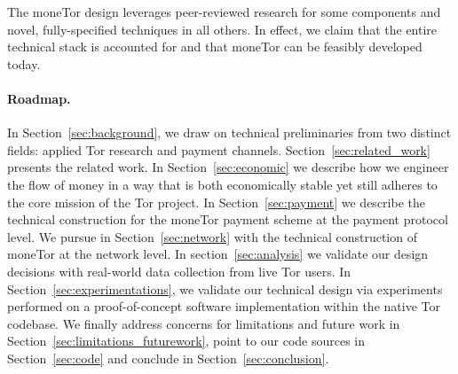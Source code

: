 The moneTor design leverages peer-reviewed research for some components and
novel, fully-specified techniques in all others. In effect, we claim that the
entire technical stack is accounted for and that moneTor can be feasibly
developed today.
\paragraph*{Roadmap.} In Section~\ref{sec:background}, we draw on technical preliminaries from two distinct fields: applied Tor research and payment channels. Section~\ref{sec:related_work} presents the related work. In Section~\ref{sec:economic} we describe how we engineer the flow of money in a way that is both economically stable yet still adheres to the core mission of the Tor project. In Section~\ref{sec:payment} we 
describe the technical construction for the moneTor payment scheme at the payment protocol level. We pursue in Section~\ref{sec:network} with the technical construction of moneTor at the network level. In section~\ref{sec:analysis} we  validate our design decisions with real-world data collection from live Tor users. 
In Section~\ref{sec:experimentations}, we validate our technical design via experiments performed on a proof-of-concept software implementation within the native Tor codebase. We finally address concerns for limitations and future work in Section~\ref{sec:limitations_futurework}, point to our code sources in Section~\ref{sec:code} and conclude in Section~\ref{sec:conclusion}.

